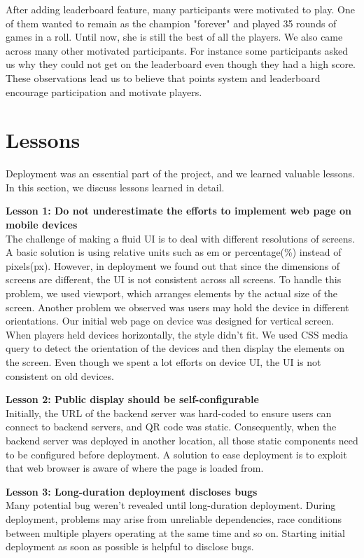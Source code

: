 \documentclass{sig-alternate}
\begin{document}
After adding leaderboard feature, many participants were motivated to play. One of them wanted to remain as the champion "forever" and played 35 rounds of games in a roll. Until now, she is still the best of all the players. We also came across many other motivated participants. For instance some participants asked us why they could not get on the leaderboard even though they had a high score. These observations lead us to believe that points system and leaderboard encourage participation and motivate players.

\section{Lessons}

Deployment was an essential part of the project\cite{storz:deployment_lessons}, and we learned valuable lessons.
In this section, we discuss lessons learned in detail.

\textbf{Lesson 1: Do not underestimate the efforts to implement web page on mobile devices}\\
The challenge of making a fluid UI is to deal with different resolutions of screens. A basic solution is using relative units such as em or percentage(\%) instead of pixels(px). However, in deployment we found out that since the dimensions of screens are different, the UI is not consistent across all screens. To handle this problem, we used viewport, which arranges elements by the actual size of the screen. Another problem we observed was users may hold the device in different orientations. Our initial web page on device was designed for vertical screen. When players held devices horizontally, the style didn't fit. We used CSS media query to detect the orientation of the devices and then display the elements on the screen. Even though we spent a lot efforts on device UI, the UI is not consistent on old devices.
 
\textbf{Lesson 2: Public display should be self-configurable}\\
Initially, the URL of the backend server was hard-coded to ensure users can connect to backend servers, and QR code was static. Consequently, when the backend server was deployed in another location, all those static components need to be configured before deployment. A solution to ease deployment is to exploit that web browser is aware of where the page is loaded from.

\textbf{Lesson 3: Long-duration deployment discloses bugs}\\
Many potential bug weren't revealed until long-duration deployment. During deployment, problems may arise from unreliable dependencies, race conditions between multiple players operating at the same time and so on. Starting initial deployment as soon as possible is helpful to disclose bugs.
\end{document}
